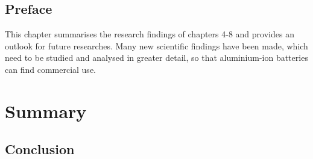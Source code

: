 \section*{Preface}
This chapter summarises the research findings of chapters 4-8 and provides an outlook for future researches. Many new scientific findings have been made, which need to be studied and analysed in greater detail, so that aluminium-ion batteries can find commercial use.
\newpage
\chapter{Summary} 
\label{chap9} 
\section{Conclusion}

